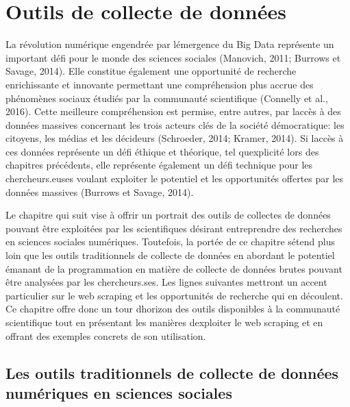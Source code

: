 \documentclass[
  letterpaper,
  DIV=11,
  numbers=noendperiod]{scrreprt}
\begin{document}

\chapter{Outils de collecte de
données}\label{outils-de-collecte-de-donnuxe9es}

La révolution numérique engendrée par l\textquotesingle émergence du Big
Data représente un important défi pour le monde des sciences sociales
(Manovich, 2011; Burrows et Savage, 2014). Elle constitue également une
opportunité de recherche enrichissante et innovante permettant une
compréhension plus accrue des phénomènes sociaux étudiés par la
communauté scientifique (Connelly et al., 2016). Cette meilleure
compréhension est permise, entre autres, par l\textquotesingle accès à
des données massives concernant les trois acteurs clés de la société
démocratique: les citoyens, les médias et les décideurs (Schroeder,
2014; Kramer, 2014). Si l\textquotesingle accès à ces données représente
un défi éthique et théorique, tel qu\textquotesingle explicité lors des
chapitres précédents, elle représente également un défi technique pour
les chercheurs.euses voulant exploiter le potentiel et les opportunités
offertes par les données massives (Burrows et Savage, 2014).~

Le chapitre qui suit vise à offrir un portrait des outils de collectes
de données pouvant être exploitées par les scientifiques désirant
entreprendre des recherches en sciences sociales numériques. Toutefois,
la portée de ce chapitre s\textquotesingle étend plus loin que les
outils traditionnels de collecte de données en abordant le potentiel
émanant de la programmation en matière de collecte de données brutes
pouvant être analysées par les chercheurs.ses. Les lignes suivantes
mettront un accent particulier sur le web scraping et les opportunités
de recherche qui en découlent. Ce chapitre offre donc un tour
d\textquotesingle horizon des outils disponibles à la communauté
scientifique tout en présentant les manières d\textquotesingle exploiter
le web scraping et en offrant des exemples concrets de son utilisation.

\section{\texorpdfstring{\textbf{Les outils traditionnels de collecte de
données numériques en sciences
sociales}}{Les outils traditionnels de collecte de données numériques en sciences sociales}}\label{les-outils-traditionnels-de-collecte-de-donnuxe9es-numuxe9riques-en-sciences-sociales}
\end{document}
